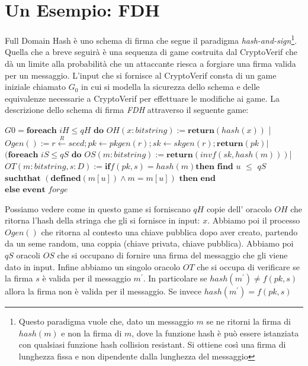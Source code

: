 \documentclass[a4paper,openright,twoside,12pt]{report}
\begin{document}
\section{Un Esempio: FDH}
Full Domain Hash \`e uno schema di firma che segue il paradigma \emph{hash-and-sign}\footnote{Questo paradigma vuole che, dato un messaggio $m$ se ne ritorni 
la firma di $hash(m)$ e non la firma di $m$, dove la funzione hash \`e pu\`o essere istanziata con qualsiasi funzione hash collision resistant. 
Si ottiene cos\`i una firma di lunghezza fissa e non dipendente dalla lunghezza del messaggio}. 
Quella che a breve seguir\`a \`e una sequenza di game costruita dal CryptoVerif che d\`a un limite alla probabilit\`a che un attaccante riesca a forgiare una firma valida
per un messaggio.
L'input che si fornisce al CryptoVerif consta di un game iniziale chiamato $G_0$ in cui si modella la sicurezza dello schema e delle equivalenze necessarie a
CryptoVerif per effettuare le modifiche ai game.
La descrizione dello schema di firma \emph{FDH} attraverso il seguente game:
\begin{center}
$G0= \textbf{foreach}$ $iH \leq qH$ $\textbf{do}$ $OH(x : bitstring) := \textbf{return}(hash(x ))$ |\\
	  $Ogen() := r \xleftarrow{R} seed ; pk \leftarrow pkgen(r ); sk \leftarrow skgen(r ); \textbf{return}(pk )|$\\
    $(\textbf{foreach}$ $iS \leq qS$ $\textbf{do}$ $OS(m : bitstring) := \textbf{return}(invf(sk , hash(m)))$|\\
  $ OT (m : bitstring, s : D) := \textbf{if} f(pk , s) = hash(m ) \textbf{then}$
   $ \textbf{find}$ $u$ $\leq$ $qS$ $\textbf{suchthat}$ $(\textbf{defined}(m[u]) ∧ m = m[u])$ $\textbf{then end}$\\
                                                            $\textbf{else event}$ $forge$
\end{center}
Possiamo vedere come in questo game si forniscano $qH$ copie dell' oracolo $OH$ che ritorna l'hash della stringa che gli si fornisce in input: $x$.
Abbiamo poi il processo $Ogen()$ che ritorna al contesto una chiave pubblica dopo aver creato, partendo da un seme random, una coppia (chiave privata, chiave pubblica).
Abbiamo poi $qS$ oracoli $OS$ che si occupano di fornire una firma del messaggio che gli viene dato in input. Infine abbiamo un singolo oracolo $OT$ che si occupa di verificare
se la firma $s$ \`e valida per il messaggio $m^{'}$. In particolare se $hash(m^{'}) \neq f(pk, s)$ allora la firma non \`e valida per il messaggio. Se invece $hash(m^{'}) = f(pk, s)$
\end{document}
